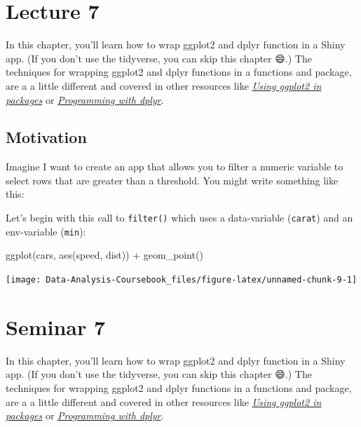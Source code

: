 \documentclass[
]{article}
\newenvironment{Shaded}{\begin{snugshade}}{\end{snugshade}}
\newcommand{\FunctionTok}[1]{\textcolor[rgb]{0.00,0.00,0.00}{#1}}
\newcommand{\NormalTok}[1]{#1}
\newcommand{\SpecialCharTok}[1]{\textcolor[rgb]{0.00,0.00,0.00}{#1}}
\begin{document}
\hypertarget{lecture7}{%
\section{Lecture 7}\label{lecture7}}

In this chapter, you'll learn how to wrap ggplot2 and dplyr function in a Shiny app.
(If you don't use the tidyverse, you can skip this chapter 😄.) The techniques for wrapping ggplot2 and dplyr functions in a functions and package, are a a little different and covered in other resources like \href{http://ggplot2.tidyverse.org/dev/articles/ggplot2-in-packages.html}{\emph{Using ggplot2 in packages}} or \href{http://dplyr.tidyverse.org/articles/programming.html}{\emph{Programming with dplyr}}.

\hypertarget{tidy-motivation}{%
\subsection{Motivation}\label{tidy-motivation}}

Imagine I want to create an app that allows you to filter a numeric variable to select rows that are greater than a threshold.
You might write something like this:

Let's begin with this call to \texttt{filter()} which uses a data-variable (\texttt{carat}) and an env-variable (\texttt{min}):

\begin{Shaded}
\begin{Highlighting}[]
\FunctionTok{ggplot}\NormalTok{(cars, }\FunctionTok{aes}\NormalTok{(speed, dist)) }\SpecialCharTok{+} 
  \FunctionTok{geom\_point}\NormalTok{()}
\end{Highlighting}
\end{Shaded}

\begin{center}\texttt{[image: Data-Analysis-Coursebook\_files/figure-latex/unnamed-chunk-9-1]} \end{center}

\hypertarget{seminar7}{%
\section{Seminar 7}\label{seminar7}}

In this chapter, you'll learn how to wrap ggplot2 and dplyr function in a Shiny app.
(If you don't use the tidyverse, you can skip this chapter 😄.) The techniques for wrapping ggplot2 and dplyr functions in a functions and package, are a a little different and covered in other resources like \href{http://ggplot2.tidyverse.org/dev/articles/ggplot2-in-packages.html}{\emph{Using ggplot2 in packages}} or \href{http://dplyr.tidyverse.org/articles/programming.html}{\emph{Programming with dplyr}}.
\end{document}
